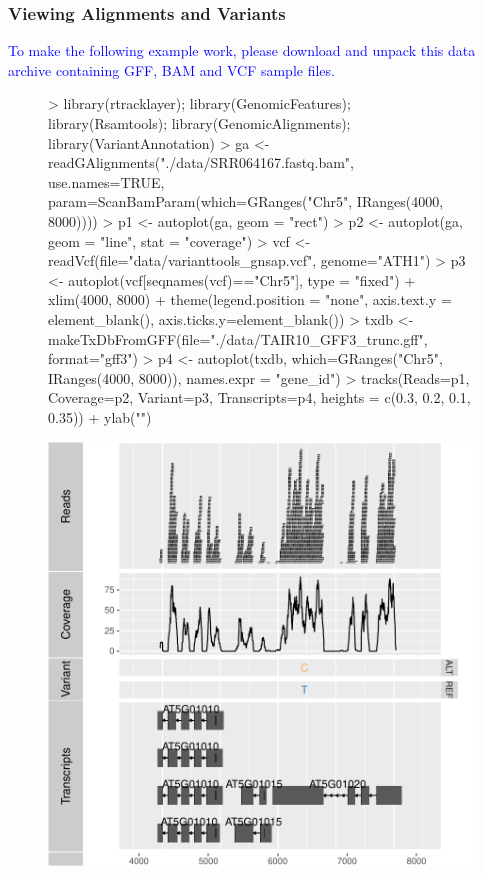 \documentclass{beamer}
\begin{document}
\begin{frame}[containsverbatim]  
	\frametitle{Viewing Alignments and Variants}
\vspace{0.3cm}
\scriptsize
\textcolor{blue}{To make the following example work, please download and unpack this data archive \href{http://biocluster.ucr.edu/~tgirke/HTML_Presentations/Manuals/Workshop_Dec_12_16_2013/Rgraphics/data.zip}{{}} containing GFF, BAM and VCF sample files.}
\vspace{-0.2cm}
\tiny 
\begin{figure}
  \centering
\begin{Schunk}
\begin{Sinput}
> library(rtracklayer); library(GenomicFeatures); library(Rsamtools); library(GenomicAlignments); library(VariantAnnotation)
> ga <- readGAlignments("./data/SRR064167.fastq.bam", use.names=TRUE, param=ScanBamParam(which=GRanges("Chr5", IRanges(4000, 8000))))
> p1 <- autoplot(ga, geom = "rect")
> p2 <- autoplot(ga, geom = "line", stat = "coverage")
> vcf <- readVcf(file="data/varianttools_gnsap.vcf", genome="ATH1")
> p3 <- autoplot(vcf[seqnames(vcf)=="Chr5"], type = "fixed") + xlim(4000, 8000) + theme(legend.position = "none", axis.text.y = element_blank(), axis.ticks.y=element_blank())
> txdb <- makeTxDbFromGFF(file="./data/TAIR10_GFF3_trunc.gff", format="gff3")
> p4 <- autoplot(txdb, which=GRanges("Chr5", IRanges(4000, 8000)), names.expr = "gene_id")
> tracks(Reads=p1, Coverage=p2, Variant=p3, Transcripts=p4, heights = c(0.3, 0.2, 0.1, 0.35)) + ylab("")
\end{Sinput}
\end{Schunk}
\includegraphics{fig--085}
\label{fig:tracks}
\end{figure}
\end{frame}
\end{document}
